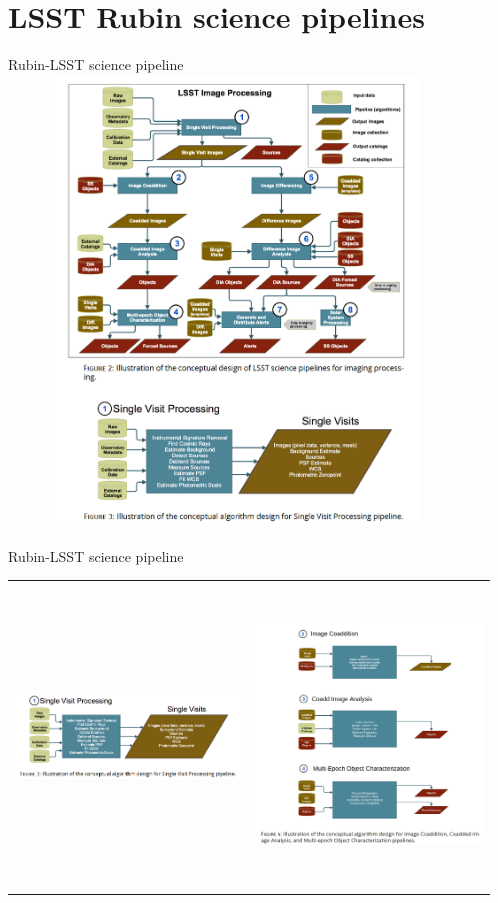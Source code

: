 \documentclass{beamer}
\begin{document}
\section{LSST Rubin science pipelines}
\begin{frame}{Rubin-LSST science pipeline}
\includegraphics[width=12cm, height=12cm]{figs/dm/DMpipelines1.png}
\end{frame}

\begin{frame}{Rubin-LSST science pipeline}
\begin{tabular}{cc}
\includegraphics[width=6cm, height=3.5cm]{figs/dm/DMpipelines11.png}
&
\includegraphics[width=6cm, height=8cm]{figs/dm/DMpipelines2.png}
\end{tabular}
\end{frame}
\end{document}
